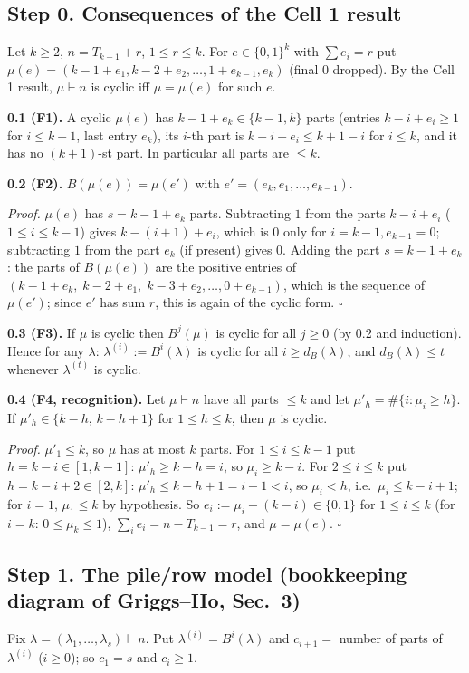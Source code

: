 \documentclass[11pt]{article}
\begin{document}
\subsection*{Step 0. Consequences of the Cell 1 result}
Let $k\ge2$, $n=T_{k-1}+r$, $1\le r\le k$. For $e\in\{0,1\}^k$ with $\sum e_i=r$ put $\mu(e)=(k-1+e_1,k-2+e_2,\dots,1+e_{k-1},e_k)$ (final $0$ dropped). By the Cell 1 result, $\mu\vdash n$ is cyclic iff $\mu=\mu(e)$ for such $e$.

\textbf{0.1 (F1).} A cyclic $\mu(e)$ has $k-1+e_k\in\{k-1,k\}$ parts (entries $k-i+e_i\ge1$ for $i\le k-1$, last entry $e_k$), its $i$-th part is $k-i+e_i\le k+1-i$ for $i\le k$, and it has no $(k+1)$-st part. In particular all parts are $\le k$.

\textbf{0.2 (F2).} $B(\mu(e))=\mu(e')$ with $e'=(e_k,e_1,\dots,e_{k-1})$.

\emph{Proof.} $\mu(e)$ has $s=k-1+e_k$ parts. Subtracting $1$ from the parts $k-i+e_i$ ($1\le i\le k-1$) gives $k-(i+1)+e_i$, which is $0$ only for $i=k-1,e_{k-1}=0$; subtracting $1$ from the part $e_k$ (if present) gives $0$. Adding the part $s=k-1+e_k$: the parts of $B(\mu(e))$ are the positive entries of $(k-1+e_k,\;k-2+e_1,\;k-3+e_2,\dots,0+e_{k-1})$, which is the sequence of $\mu(e')$; since $e'$ has sum $r$, this is again of the cyclic form. $\square$

\textbf{0.3 (F3).} If $\mu$ is cyclic then $B^j(\mu)$ is cyclic for all $j\ge0$ (by 0.2 and induction). Hence for any $\lambda$: $\lambda^{(i)}:=B^i(\lambda)$ is cyclic for all $i\ge d_B(\lambda)$, and $d_B(\lambda)\le t$ whenever $\lambda^{(t)}$ is cyclic.

\textbf{0.4 (F4, recognition).} Let $\mu\vdash n$ have all parts $\le k$ and let $\mu'_h=\#\{i:\mu_i\ge h\}$. If $\mu'_h\in\{k-h,\,k-h+1\}$ for $1\le h\le k$, then $\mu$ is cyclic.

\emph{Proof.} $\mu'_1\le k$, so $\mu$ has at most $k$ parts. For $1\le i\le k-1$ put $h=k-i\in[1,k-1]$: $\mu'_{h}\ge k-h=i$, so $\mu_i\ge k-i$. For $2\le i\le k$ put $h=k-i+2\in[2,k]$: $\mu'_h\le k-h+1=i-1<i$, so $\mu_i<h$, i.e.\ $\mu_i\le k-i+1$; for $i=1$, $\mu_1\le k$ by hypothesis. So $e_i:=\mu_i-(k-i)\in\{0,1\}$ for $1\le i\le k$ (for $i=k$: $0\le\mu_k\le1$), $\sum_i e_i=n-T_{k-1}=r$, and $\mu=\mu(e)$. $\square$

\subsection*{Step 1. The pile/row model (bookkeeping diagram of Griggs--Ho, Sec.~3)}
Fix $\lambda=(\lambda_1,\dots,\lambda_s)\vdash n$. Put $\lambda^{(i)}=B^i(\lambda)$ and $c_{i+1}=$ number of parts of $\lambda^{(i)}$ ($i\ge0$); so $c_1=s$ and $c_i\ge1$.
\end{document}
